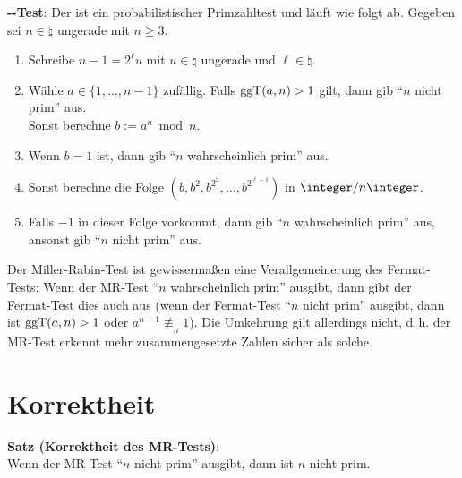 \textbf{--Test}:
Der  ist ein probabilistischer Primzahltest
und läuft wie folgt ab.
Gegeben sei $n \in \natural$ ungerade mit $n \ge 3$.
\begin{enumerate}
    \item
    Schreibe $n - 1 = 2^\ell u$ mit $u \in \natural$ ungerade und $\ell \in \natural$.

    \item
    Wähle $a \in \{1, \dotsc, n - 1\}$ zufällig.
    Falls $\operatorname{ggT}(a, n) > 1$ gilt, dann gib "`$n$ nicht prim"' aus.\\
    Sonst berechne $b := a^u \bmod n$.

    \item
    Wenn $b = 1$ ist, dann gib "`$n$ wahrscheinlich prim"' aus.

    \item
    Sonst berechne die Folge $(b, b^2, b^{2^2}, \dotsc, b^{2^{\ell-1}})$ in $\ZnZ$.

    \item
    Falls $-1$ in dieser Folge vorkommt, dann gib "`$n$ wahrscheinlich prim"' aus,
    ansonst gib "`$n$ nicht prim"' aus.
\end{enumerate}
Der Miller-Rabin-Test ist gewissermaßen eine Verallgemeinerung des Fermat-Tests:
Wenn der MR-Test "`$n$ wahrscheinlich prim"' ausgibt, dann gibt der Fermat-Test dies auch aus
(wenn der Fermat-Test "`$n$ nicht prim"' ausgibt, dann ist $\operatorname{ggT}(a, n) > 1$ oder
$a^{n-1} \not\equiv_n 1$).
Die Umkehrung gilt allerdings nicht,
d.\,h. der MR-Test erkennt mehr zusammengesetzte Zahlen sicher als solche.

\pagebreak

\section{%
    Korrektheit%
}

\textbf{Satz (Korrektheit des MR-Tests)}:\\
Wenn der MR-Test "`$n$ nicht prim"' ausgibt, dann ist $n$ nicht prim.

